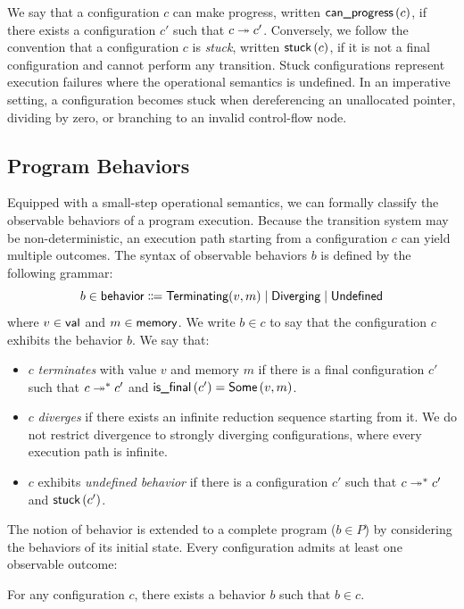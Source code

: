 \documentclass[report.tex]{subfiles}
\begin{document}
We say that a configuration $c$ can make progress,
written $\canp{c}$,
if there exists a configuration $c'$
such that $\step{c}{c'}$.
Conversely,
we follow the convention that a configuration $c$ is \emph{stuck},
written $\stuck{c}$,
if it is not a final configuration
and cannot perform any transition.
Stuck configurations represent execution failures
where the operational semantics is undefined.
In an imperative setting,
a configuration becomes stuck when dereferencing an unallocated pointer,
dividing by zero,
or branching to an invalid control-flow node.

\subsection{Program Behaviors}

Equipped with a small-step operational semantics,
we can formally classify the observable behaviors of a program execution.
Because the transition system may be non-deterministic,
an execution path starting from a configuration $c$
can yield multiple outcomes.
The syntax of observable behaviors $b$ is defined by the following grammar:
\begin{equation*}
  b \in \textsf{behavior} \Coloneqq \textsf{Terminating}(v, m) \mid \textsf{Diverging} \mid \textsf{Undefined}
\end{equation*}
where $v \in \textsf{val}$ and $m \in \textsf{memory}$.
We write $b \in c$
to say that the configuration $c$ exhibits the behavior $b$.
We say that:
\begin{itemize}
  \item $c$ \emph{terminates} with value $v$ and memory $m$
        if there is a final configuration $c'$
        such that $\steps{c}{c'}$ and $\isfinal{c'} = \Some{v, m}$.

  \item $c$ \emph{diverges} if there exists an infinite reduction sequence
        starting from it.
        We do not restrict divergence to strongly diverging configurations,
        where every execution path is infinite.

  \item $c$ exhibits \emph{undefined behavior}
        if there is a configuration $c'$
        such that $\steps{c}{c'}$ and $\stuck{c'}$.
\end{itemize}

The notion of behavior is extended to a complete program ($b \in P$)
by considering the behaviors of its initial state.
Every configuration admits at least one observable outcome:
\begin{lemma}
For any configuration $c$,
there exists a behavior $b$ such that $b \in c$.
\end{lemma}
\end{document}
